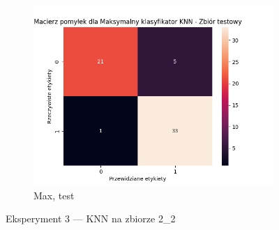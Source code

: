 \documentclass[12pt]{article}
\newcommand*{\subfigwidth}{0.24\textwidth}
\begin{document}
\begin{figure}[H]
\begin{subfigure}[t]{\subfigwidth}
        \includegraphics[width=\linewidth]{img/exp_3/knn/2_2/max/test_matrix.png}
        \caption{Max, test}
    \end{subfigure} 
    
    \caption{Eksperyment 3 --- KNN na zbiorze 2\_2}\label{fig:figure10}
\end{figure}
\end{document}
